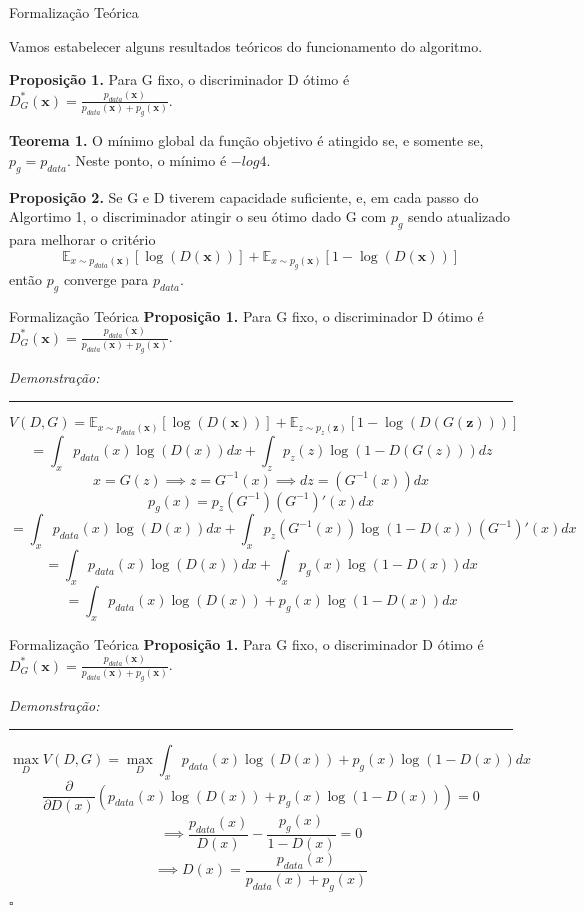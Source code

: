 \documentclass[10pt]{beamer}
\newcommand*{\QEDB}{\hfill\ensuremath{\square}}%
\begin{document}
\begin{frame}[fragile]{Formalização Teórica}
	
	Vamos estabelecer alguns resultados teóricos do funcionamento
	do algoritmo.

	\small
	\textbf{Proposição 1.} Para G fixo, o discriminador D ótimo é
	$
	D^*_G(\bm x) = \frac{p_{data}(\bm x)}
	{p_{data}(\bm x) + p_g(\bm x)}
	$.

	\hfill
	\break
	\textbf{Teorema 1.} O mínimo global da função objetivo
	é atingido se, e somente se, $p_g = p_{data}$. Neste ponto,
	o mínimo é $-log 4$.

	\hfill
	\break
	\textbf{Proposição 2.} Se G e D tiverem capacidade suficiente,
	e, em cada passo do Algortimo 1, o discriminador atingir o seu
	ótimo dado G com $p_g$ sendo atualizado para melhorar o critério
    $$
    \mathbb{E}_{x\sim p_{data}(\bm x)}\left[\log{(D(\bm x))}\right]+
    \mathbb{E}_{x\sim p_g(\bm x)}\left[1-\log{(D(\bm x))}\right]
    $$
    então $p_g$ converge para $p_{data}$.

\end{frame}

\begin{frame}[fragile]{Formalização Teórica}
\small
	\textbf{Proposição 1.} Para G fixo, o discriminador D ótimo é
	$
	D^*_G(\bm x) = \frac{p_{data}(\bm x)}
	{p_{data}(\bm x) + p_g(\bm x)}
	$.

	\textit{Demonstração:}
	\hrule
  $$V(D,G)=
    \mathbb{E}_{x\sim p_{data}(\bm x)}\left[\log{(D(\bm x))}\right]+
    \mathbb{E}_{z\sim p_z(\bm z)}\left[1-\log{(D(G(\bm z)))}\right]
  $$
  \pause
  $$= \int_x p_{data}(x)\log{(D(x))}dx + \int_z p_z(z)\log{(1-D(G(z)))}dz $$
  \pause
  $$x = G(z) \implies z = G^{-1}(x) \implies dz = (G^{-1}(x))dx $$
  $$p_g(x) = p_z(G^{-1})(G^{-1})'(x)dx $$
  \pause
  $$= \int_x p_{data}(x)\log{(D(x))}dx + \int_x p_z(G^{-1}(x))\log{(1-D(x))}(G^{-1})'(x)dx $$
  \pause
  $$= \int_x p_{data}(x)\log{(D(x))}dx + \int_x p_g(x)\log{(1-D(x))}dx $$
  \pause
  $$= \int_x p_{data}(x)\log{(D(x))} + p_g(x)\log{(1-D(x))}dx $$
\end{frame}

\begin{frame}[fragile]{Formalização Teórica}
\small
	\textbf{Proposição 1.} Para G fixo, o discriminador D ótimo é
	$
	D^*_G(\bm x) = \frac{p_{data}(\bm x)}
	{p_{data}(\bm x) + p_g(\bm x)}
	$.

	\textit{Demonstração:}
	\hrule
 $$\max_{D} V(D,G) = \max_{D}\int_x p_{data}(x)\log{(D(x))} + p_g(x)\log{(1-D(x))}dx $$
 \pause
 $$\frac{\partial}{\partial D(x)} \left(p_{data}(x)\log{(D(x))} + p_g(x)\log{(1-D(x))}\right) = 0 $$
 \pause
 $$\implies \dfrac{p_{data}(x)}{D(x)} - \dfrac{p_g(x)}{1 - D(x)} = 0 $$
 $$\implies D(x) = \dfrac{p_{data}(x)}{p_{data}(x)+p_g(x)} $$
 \QEDB
\end{frame}
\end{document}

